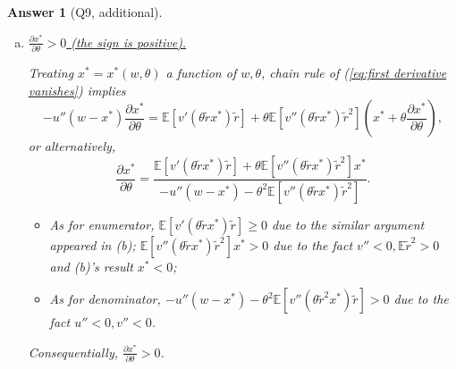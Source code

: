\documentclass{article}
\newtheorem*{ans}{Answer}
\newcommand {\Reals}  {{\rm I \! R}}
\newcommand{\1}{{\bf 1}}
\newcommand{\bbE}{\mathbb{E}}
\newcommand{\0}{{\mathbf{0}}}
\newcommand{\<}{\langle}
\renewcommand{\>}{\rangle}
\begin{document}
\begin{ans}[Q9, additional]
\begin{enumerate}[(a)]
		Suppose not, that is, $x^*$ is nonnegative around certain $x_0^*$. One observation is that: since $v' >0,v'' <0$, we have 
		\begin{eqnarray*}
			\bbE\left[ v' (\theta\tilde r x^*) \tilde r\right] & = & \int_{\Reals } v' (\theta\tilde r x^*) \tilde r d\tilde r  \xlongequal{y \leftarrow \theta\tilde r x^*}   (\theta x^*)^{-2}  \int_{\Reals } v' (y) y dy   \\
			& = &  (\theta x^*)^{-2}\left[   \int_{- \infty } v' (y) y dy +  \int_{0 }^{ \infty } v' (y) y dy\right]\\
			& \le&  (\theta x^*)^{-2}\left[   \int_{- \infty }^0 v' (0) y dy +  \int_{0 }^{ \infty } v' (0) y dy\right] = v'(0) \bbE  \tilde r  = 0,
		\end{eqnarray*} due to the fact that $v' (\theta\tilde r x^*_0 ) $ is nondecreasing with respect to $\tilde r$. Together with the fact that $-u' <0$, we get $\frac{\partial f}{\partial x}(x^*_0; w,\theta) <0 $, contradictory to (\ref{eq:first derivative vanishes}).
		
		As a result, $x^*$ is always negative.
		\item \underline{$\frac{\partial x^*}{ \partial \theta} >0$ (the sign is positive).}
		
		Treating $x^* = x^*(w, \theta)$ a function of $w, \theta$, chain rule of (\ref{eq:first derivative vanishes}) implies 
		$$
		- u''(w - x^*) \frac{\partial x^*}{ \partial \theta} = \bbE\left[ v' (\theta\tilde r x^*) \tilde r\right] + \theta \bbE\left[ v'' (\theta\tilde r x^* ) \tilde r^2 \right] \left(x^* + \theta \frac{\partial x^*}{ \partial \theta} \right),
		$$
		or alternatively,
				$$
  \frac{\partial x^*}{ \partial \theta} =\frac{ \bbE\left[ v' (\theta\tilde r x^*) \tilde r\right] + \theta  \bbE\left[ v'' (\theta\tilde r x^*) \tilde r^2\right] x^*}{	- u''(w - x^*) -  \theta^2  \bbE\left[ v'' (\theta\tilde r x^* ) \tilde r ^2\right] }. 
		$$ 
		\begin{itemize}
			\item As for enumerator, $\bbE\left[ v' (\theta\tilde r x^*) \tilde r\right]  \ge 0$ due to the similar argument appeared in (b); $\bbE\left[ v'' (\theta\tilde r x^*) \tilde r^2\right] x^* >0$ due to the fact $v''<0, \bbE \tilde r^2 >0$ and (b)'s result $x^* <0$;
			\item As for denominator,  $- u''(w - x^*) -  \theta^2  \bbE\left[ v'' (\theta\tilde r^2 x^* ) \tilde r \right] > 0$ due to the fact $u''<0, v''<0$.
		\end{itemize}
	Consequentially, $  \frac{\partial x^*}{ \partial \theta} >0$.
	\end{enumerate}
\end{ans}
\end{document}
